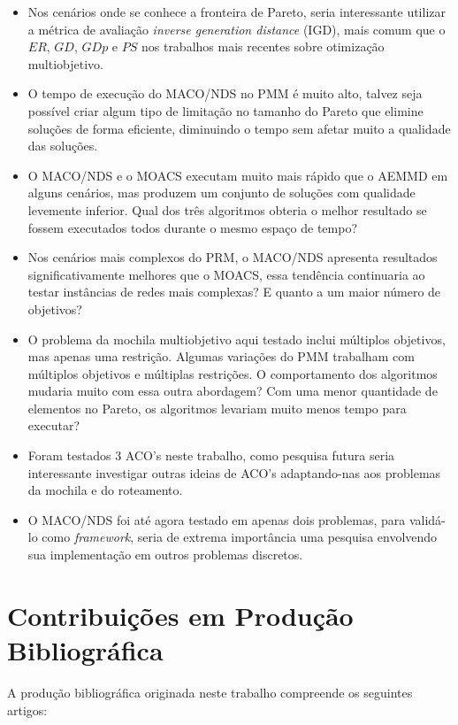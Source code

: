 \begin{itemize}
	\item Nos cenários onde se conhece a fronteira de Pareto, seria interessante utilizar a métrica de avaliação \textit{inverse generation distance} (IGD), mais comum que o $ER$, $GD$, $GDp$ e $PS$ nos trabalhos mais recentes sobre otimização multiobjetivo.
	\item O tempo de execução do MACO/NDS no PMM é muito alto, talvez seja possível criar algum tipo de limitação no tamanho do Pareto que elimine soluções de forma eficiente, diminuindo o tempo sem afetar muito a qualidade das soluções.
	\item O MACO/NDS e o MOACS executam muito mais rápido que o AEMMD em alguns cenários, mas produzem um conjunto de soluções com qualidade levemente inferior. Qual dos três algoritmos obteria o melhor resultado se fossem executados todos durante o mesmo espaço de tempo?
	\item Nos cenários mais complexos do PRM, o MACO/NDS apresenta resultados significativamente melhores que o MOACS, essa tendência continuaria ao testar instâncias de redes mais complexas? E quanto a um maior número de objetivos?
	\item O problema da mochila multiobjetivo aqui testado inclui múltiplos objetivos, mas apenas uma restrição. Algumas variações do PMM trabalham com múltiplos objetivos e múltiplas restrições. O comportamento dos algoritmos mudaria muito com essa outra abordagem? Com uma menor quantidade de elementos no Pareto, os algoritmos levariam muito menos tempo para executar?
	\item Foram testados 3 ACO's neste trabalho, como pesquisa futura seria interessante investigar outras ideias de ACO's adaptando-nas aos problemas da mochila e do roteamento.
	\item O MACO/NDS foi até agora testado em apenas dois problemas, para validá-lo como \textit{framework}, seria de extrema importância uma pesquisa envolvendo sua implementação em outros problemas discretos.
\end{itemize}

\section{Contribuições em Produção Bibliográfica}
A produção bibliográfica originada neste trabalho compreende os seguintes artigos:

